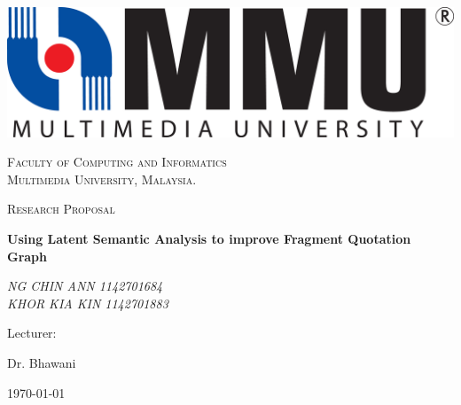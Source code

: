 \documentclass[a4paper, 12pt]{article}
\begin{document}


\begin{titlepage}
	\centering
	\includegraphics[scale=0.5]{mmulogo.png}\par\vspace{1cm}
	{\scshape\LARGE Faculty of Computing and Informatics \\
  					Multimedia University, Malaysia. \par}
	\vspace{1cm}
	{\scshape\Large Research Proposal\par}
	\vspace{1.5cm}
	{\huge\bfseries Using Latent Semantic Analysis to improve Fragment Quotation Graph\par}
	\vspace{2cm}
	{\Large\itshape NG CHIN ANN 1142701684 \\ KHOR KIA KIN 1142701883\par}
	
	\vfill
	
	Lecturer: \par
	Dr. Bhawani 

	\vfill

	{\large \today\par}
\end{titlepage}

\pagebreak
\end{document}

